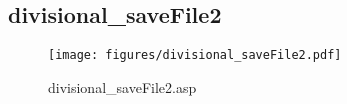 \subsection{divisional\_saveFile2}
\begin{figure}[htb]
    \begin{center}
        \texttt{[image: figures/divisional\_saveFile2.pdf]}
    \end{center}
    \caption{divisional\_saveFile2.asp}
    \label{fig:divisional_saveFile2}
\end{figure}
